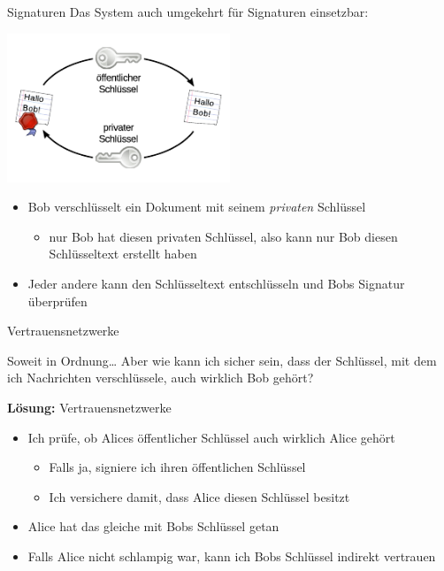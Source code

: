 \documentclass{beamer}
\begin{document}
\begin{frame}{Signaturen}
Das System auch umgekehrt für Signaturen einsetzbar:
\begin{center}
	\includegraphics[width=0.5\textwidth]{public-private-signature.pdf}
\end{center}
\begin{itemize}
	\item Bob verschlüsselt ein Dokument mit seinem \emph{privaten} Schlüssel
		\begin{itemize}
			\item nur Bob hat diesen privaten Schlüssel, also kann nur Bob diesen
				Schlüsseltext erstellt haben
		\end{itemize}
	\item Jeder andere kann den Schlüsseltext entschlüsseln und Bobs Signatur
		überprüfen
\end{itemize}
\end{frame}

\begin{frame}{Vertrauensnetzwerke}
\begin{block}{Soweit in Ordnung\ldots}
	Aber wie kann ich sicher sein, dass der Schlüssel, mit dem ich
	Nachrichten verschlüssele, auch wirklich Bob gehört?
\end{block}

\pause
\textbf{Lösung:} Vertrauensnetzwerke
\begin{itemize}
	\item Ich prüfe, ob Alices öffentlicher Schlüssel auch wirklich Alice gehört
	\begin{itemize}
		\item Falls ja, signiere ich ihren öffentlichen Schlüssel
		\item Ich versichere damit, dass Alice diesen Schlüssel besitzt
	\end{itemize}
	\item Alice hat das gleiche mit Bobs Schlüssel getan
	\item Falls Alice nicht schlampig war, kann ich Bobs Schlüssel indirekt
		vertrauen
\end{itemize}
\end{frame}
\end{document}
